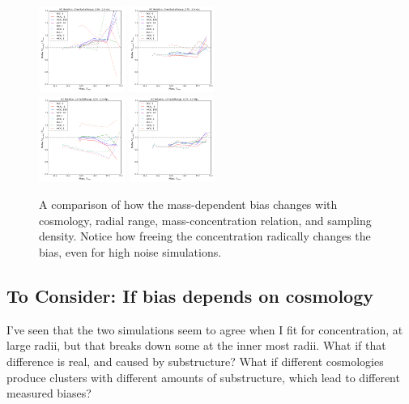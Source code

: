 \documentclass[11pt]{article}
\begin{document}
\begin{figure}
\includegraphics[width=0.25\textwidth]{figures/density_cfree-r5}
\includegraphics[width=0.25\textwidth]{figures/density_cfree-r10}\\
\includegraphics[width=0.25\textwidth]{figures/density_c4-r5}
\includegraphics[width=0.25\textwidth]{figures/density_c4-r10}
\caption{A comparison of how the mass-dependent bias changes with cosmology, radial range, mass-concentration relation, and sampling density. Notice how freeing the concentration radically changes the bias, even for high noise simulations.}
\end{figure}

\subsection{To Consider: If bias depends on cosmology}

I've seen that the two simulations seem to agree when I fit for concentration, at large radii, but that breaks down some at the inner most radii. What if that difference is real, and caused by substructure? What if different cosmologies produce clusters with different amounts of substructure, which lead to different measured biases? 
\end{document}
